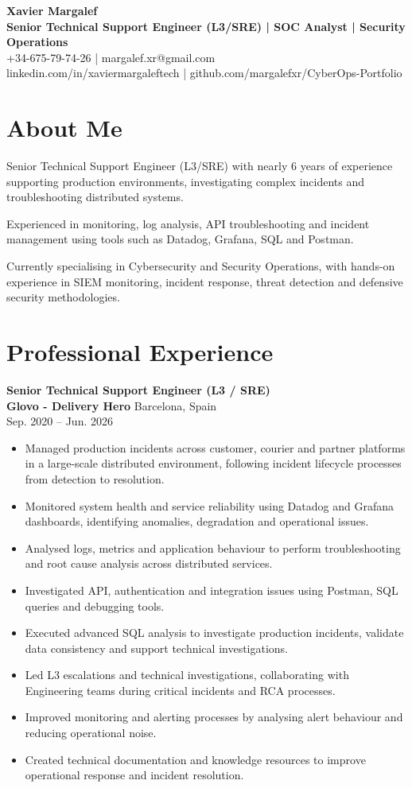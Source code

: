 \documentclass[10pt,a4paper]{article}
\begin{document}
{\Huge \textbf{Xavier Margalef}}\\
{\large \textbf{Senior Technical Support Engineer (L3/SRE) | SOC Analyst | Security Operations}}\\[2mm]
+34-675-79-74-26 | margalef.xr@gmail.com\\
linkedin.com/in/xaviermargaleftech | github.com/margalefxr/CyberOps-Portfolio

\section*{About Me}
Senior Technical Support Engineer (L3/SRE) with nearly 6 years of experience supporting production environments, investigating complex incidents and troubleshooting distributed systems.

Experienced in monitoring, log analysis, API troubleshooting and incident management using tools such as Datadog, Grafana, SQL and Postman.

Currently specialising in Cybersecurity and Security Operations, with hands-on experience in SIEM monitoring, incident response, threat detection and defensive security methodologies.

\section*{Professional Experience}
\textbf{Senior Technical Support Engineer (L3 / SRE)}\\
\textbf{Glovo - Delivery Hero} \hfill Barcelona, Spain\\
Sep. 2020 -- Jun. 2026

\begin{itemize}
\item Managed production incidents across customer, courier and partner platforms in a large-scale distributed environment, following incident lifecycle processes from detection to resolution.
\item Monitored system health and service reliability using Datadog and Grafana dashboards, identifying anomalies, degradation and operational issues.
\item Analysed logs, metrics and application behaviour to perform troubleshooting and root cause analysis across distributed services.
\item Investigated API, authentication and integration issues using Postman, SQL queries and debugging tools.
\item Executed advanced SQL analysis to investigate production incidents, validate data consistency and support technical investigations.
\item Led L3 escalations and technical investigations, collaborating with Engineering teams during critical incidents and RCA processes.
\item Improved monitoring and alerting processes by analysing alert behaviour and reducing operational noise.
\item Created technical documentation and knowledge resources to improve operational response and incident resolution.
\end{itemize}
\end{document}

